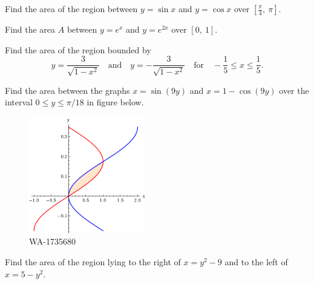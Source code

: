 \documentclass[12pt,addpoints, answers, fleqn]{exam}
\begin{document}
\begin{teacher}
\begin{questions}
\question 	%

Find the area of the region between $y = \sin x$ and $y = \cos x$ over $\left[ \frac{\pi}{4}, \ \pi\right]$.
 \begin{solution}
 \end{solution}


\question 	%

Find the area $A$ between $y = e^x$ and $y = e^{2x}$ over $\left[ 0, \ 1 \right]$.

 \begin{solution}
 \end{solution}

\question 	%

Find the area of the region bounded by 
\[
y = \frac{3}{\sqrt{1-x^2}} \quad \text{and} \quad y = -\frac{3}{\sqrt{1-x^2}} \quad \text{for} \quad -\frac{1}{5} \leq x \leq \frac{1}{5}.
\]
 \begin{solution}
 \end{solution}


\question 	%

Find the area between the graphs $x = \sin \left(9y\right)$ and $x = 1 - \cos \left(9y\right)$ over the interval $0 \leq y \leq \pi /18$ in figure below.

\begin{figure}[htbp] %
   \centering
   \includegraphics[width=2in]{./graphics/1735680.pdf} 
   \caption{WA-1735680}
   \label{fig:1735680}
\end{figure}
 \begin{solution}
 \end{solution}
 
\question 	%

Find the area of the region lying to the right of $x = y^2 - 9$ and to the left of $x = 5 - y^2$.
  \begin{solution}
 \end{solution}
 
 
\end{questions}
\end{teacher}
\end{document}
